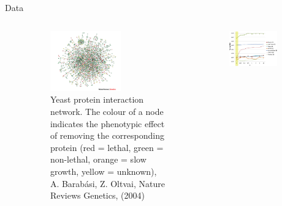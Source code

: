 \documentclass[final]{beamer} %
\newcommand{\mycite}[1]{\begin{textblock*}{4cm}(8.7cm,8.6cm)
    \begin{beamercolorbox}[ht=0.5cm,right]{framesource}
        \usebeamerfont{framesource}\usebeamercolor[fg]{framesource} {#1}
    \end{beamercolorbox}
\end{textblock*}}
\begin{document}
\begin{frame}{}
\begin{block}{Data}
\begin{columns}[T]
\begin{column}{0.25\textwidth}
\begin{figure}
        \end{figure}
      \end{column}

      \begin{column}{0.25\paperwidth}
        \begin{figure}
          \includegraphics[width=0.6\textwidth]{yeastProteinInteractionNetwork}
          \caption{\tiny Yeast protein interaction network. The colour of a node indicates the phenotypic effect of removing the corresponding protein ({\color{red}red} = lethal, {\color{green}green} = non-lethal, {\color{orange}orange} = slow growth, {\color{yellow}yellow} = unknown), A. Barabási, Z. Oltvai, Nature Reviews Genetics, (2004)}
        \end{figure}
      \end{column}
      \begin{column}{0.3\textwidth}
        \begin{figure}
          \includegraphics[width=0.8\textwidth]{NICK-perfs}
        \end{figure}
      \end{column}
    \end{columns}
  \end{block}


\end{frame}
\end{document}
